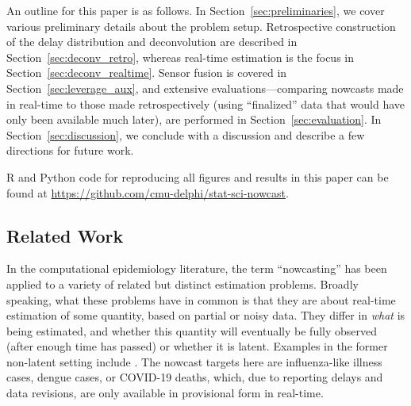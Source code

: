 \documentclass[sts]{imsart}
\theoremstyle{plain}
\theoremstyle{definition}
\theoremstyle{remark}
\begin{document}
An outline for this paper is as follows. In Section~\ref{sec:preliminaries}, we
cover various preliminary details about the problem setup. Retrospective
construction of the delay distribution and deconvolution are described in
Section~\ref{sec:deconv_retro}, whereas real-time estimation is the focus in
Section~\ref{sec:deconv_realtime}. Sensor fusion is covered in
Section~\ref{sec:leverage_aux}, and extensive evaluations---comparing nowcasts
made in real-time to those made retrospectively (using ``finalized'' data that
would have only been available much later), are performed in
Section~\ref{sec:evaluation}. In Section~\ref{sec:discussion}, we conclude with
a discussion and describe a few directions for future work. 

R and Python code
for reproducing all figures and results in this paper can be found at
\url{https://github.com/cmu-delphi/stat-sci-nowcast}. 

\subsection{Related Work}
\label{sec:related_work}

In the computational epidemiology literature, the term ``nowcasting'' has been
applied to a variety of related but distinct estimation problems. Broadly
speaking, what these problems have in common is that they are about real-time
estimation of some quantity, based on partial or noisy data. They differ in
\emph{what} is being estimated, and whether this quantity will
eventually be fully observed (after enough time has passed) or whether it is 
latent. Examples in the former non-latent setting include \citet{Yang:2015,
  Farrow:2016, Jahja:2019, Brooks:2020, McGough:2020, Hawryluk:2021}. The
nowcast targets here are influenza-like illness cases, dengue cases, or
COVID-19 deaths, which, due to reporting delays and data revisions, are only 
available in provisional form in real-time. 
\end{document}
